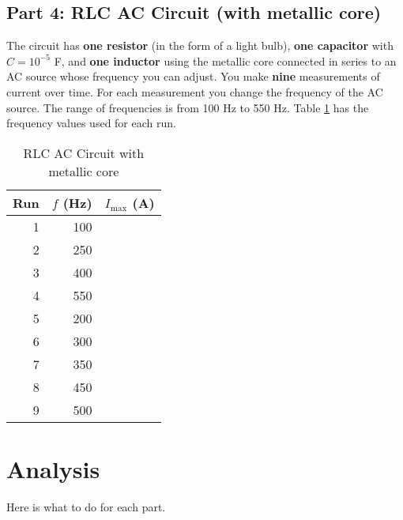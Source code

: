 \subsection{Part 4: RLC AC Circuit (with metallic core)}
The circuit has \textbf{one resistor} (in the form of a light bulb), \textbf{one capacitor} with $C = 10^{-5}$ F, and \textbf{one inductor} using the metallic core connected in series to an AC source whose frequency you can adjust. You make \textbf{nine} measurements of current over time. For each measurement you change the frequency of the AC source. The range of frequencies is from 100 Hz to 550 Hz. Table \ref{table.RLCcore} has the frequency values used for each run.
\begin{table}[ht!]
	\begin{center}
		\begin{tabular}{|r|r|r|}\hline
			Run & $f$ (Hz) & $I_{\text{max}}$ (A) \\
			\hline
			1 & 100 & \\
			2 & 250 & \\
			3 & 400 & \\
			4 & 550 & \\
			5 & 200 & \\
			6 & 300 & \\
			7 & 350 & \\
			8 & 450 & \\
			9 & 500 & \\
			\hline
		\end{tabular}
	\end{center}
	\caption{RLC AC Circuit with metallic core}
	\label{table.RLCcore}
\end{table}
\section{Analysis}
Here is what to do for each part.
